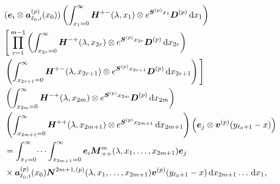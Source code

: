 \begin{align}
	&(\bs e_i \otimes \bs   a_{\ell_0,i}^{(p)}(x_0)) \left( \int_{x_1=0}^\infty \bs H^{+-}(\lambda,x_1)\otimes e^{\bs{S}^{(p)}x_1}\bs{D}^{(p)}\wrt x_1 \right)\nonumber%
	\\&\Bigg[\prod_{r=1}^{m-1} \left(\int_{x_{2r}=0}^\infty \bs H^{-+}(\lambda,x_{2r}) \otimes e^{\bs{S}^{(p)}x_{2r}}\bs{D}^{(p)}\wrt x_{2r}\right) \nonumber 
	\\&\nonumber \left(\int_{x_{2r+1}=0}^\infty \bs H^{+-}(\lambda,x_{2r+1})
	\otimes e^{\bs{S}^{(p)}x_{2r+1}}\bs{D}^{(p)} \wrt x_{2r+1} \right)\Bigg] 
	\\&\left(\int_{x_{2m}=0}^\infty \bs H^{-+}(\lambda,x_{2m})
	  \otimes e^{\bs{S}^{(p)}x_{2m}}\bs{D}^{(p)} \wrt x_{2m} \right) \nonumber 
	\\&\left(\int_{x_{2m+1}=0}^\infty \bs H^{++}(\lambda,x_{2m+1})\otimes 
	e^{\bs{S}^{(p)}x_{2m+1}} \wrt x_{2m+1}\right) \left(\bs e_j \otimes {\bs v}^{(p)}(y_{\ell_0+1}-x)\right) \nonumber
	\\&=\int_{x_1=0}^\infty \dots \int_{x_{2m+1}=0}^\infty \bs e_i\bs M^{m}_{++}(\lambda,x_1,\dots,x_{2m+1})\bs e_j \nonumber 
	\\&\times \bs a_{\ell_0,i}^{(p)}(x_0) \bs N^{2m+1,(p)}(\lambda,x_1,\dots,x_{2m+1}) {\bs v}^{(p)}(y_{\ell_0+1}-x)\wrt x_{2m+1}\dots\wrt x_1 ,

\end{align}
